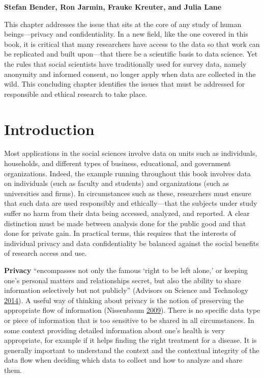 \documentclass[]{krantz}
\begin{document}
\textbf{Stefan Bender, Ron Jarmin, Frauke Kreuter, and Julia Lane}

This chapter addresses the issue that sits at the core of any study of
human beings---privacy and confidentiality. In a new field, like the one
covered in this book, it is critical that many researchers have access
to the data so that work can be replicated and built upon---that there
be a scientific basis to data science. Yet the rules that social
scientists have traditionally used for survey data, namely anonymity and
informed consent, no longer apply when data are collected in the wild.
This concluding chapter identifies the issues that must be addressed for
responsible and ethical research to take place.

\section{Introduction}\label{introduction-5}

Most applications in the social sciences involve data on units such as
individuals, households, and different types of business, educational,
and government organizations. Indeed, the example running throughout
this book involves data on individuals (such as faculty and students)
and organizations (such as universities and firms). In circumstances
such as these, researchers must ensure that such data are used
responsibly and ethically---that the subjects under study suffer no harm
from their data being accessed, analyzed, and reported. A clear
distinction must be made between analysis done for the public good and
that done for private gain. In practical terms, this requires that the
interests of individual privacy and data confidentiality be balanced
against the social benefits of research access and use.

\textbf{Privacy} ``encompasses not only the famous `right to be left
alone,' or keeping one's personal matters and relationships secret, but
also the ability to share information selectively but not publicly''
(Advisors on Science and Technology
\protect\hyperlink{ref-house2014big}{2014}). A useful way of thinking
about privacy is the notion of preserving the appropriate flow of
information (Nissenbaum \protect\hyperlink{ref-nissenbaum2009}{2009}).
There is no specific data type or piece of information that is too
sensitive to be shared in all circumstances. In some context providing
detailed information about one's health is very appropriate, for example
if it helps finding the right treatment for a disease. It is generally
important to understand the context and the contextual integrity of the
data flow when deciding which data to collect and how to analyze and
share them.
\end{document}
